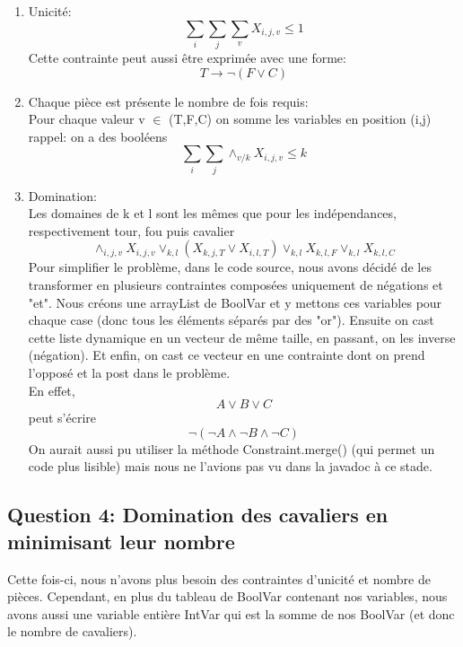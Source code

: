 \begin{enumerate}
    \item Unicité:
    \[ \sum_{i} \sum_{j} \sum_{v} X_{i,j,v}  \leq 1 \]
    Cette contrainte peut aussi être exprimée avec une forme: \[ T \longrightarrow \neg ( F \lor C ) \]
    
    \item Chaque pièce est présente le nombre de fois requis:\\
    Pour chaque valeur v $\in$ (T,F,C) on somme les variables en position (i,j) \\ rappel: on a des booléens
    \[\sum_{i} \sum_{j} \land_{v / k}   X_{i,j,v}  \leq k \]
    
    \item Domination:\\
    Les domaines de k et l sont les mêmes que pour les indépendances, respectivement tour, fou puis cavalier
    \[  \land_{i,j,v} X_{i,j,v} \lor_{k,l} ( X_{k,j,T} \lor X_{i,l,T} ) \lor_{k,l} X_{k,l,F} \lor_{k,l} X_{k,l,C} \]
    Pour simplifier le problème, dans le code source, nous avons décidé de les transformer en plusieurs contraintes composées uniquement de négations et "et". Nous créons une arrayList de BoolVar et y mettons ces variables pour chaque case (donc tous les éléments séparés par des "or"). Ensuite on cast cette liste dynamique en un vecteur de même taille, en passant, on les inverse (négation). Et enfin, on cast ce vecteur en une contrainte dont on prend l'opposé et la post dans le problème.\\
    En effet,
    \[  A \lor B \lor C \]
    peut s'écrire
    \[  \neg ( \neg A \land \neg B \land \neg C )\]
    On aurait aussi pu utiliser la méthode Constraint.merge() (qui permet un code plus lisible) mais nous ne l'avions pas vu dans la javadoc à ce stade.
\end{enumerate}



\subsection{Question 4: Domination des cavaliers en minimisant leur nombre}
Cette fois-ci, nous n'avons plus besoin des contraintes d'unicité et nombre de pièces. Cependant, en plus du tableau de BoolVar contenant nos variables, nous avons aussi une variable entière IntVar qui est la somme de nos BoolVar (et donc le nombre de cavaliers).


